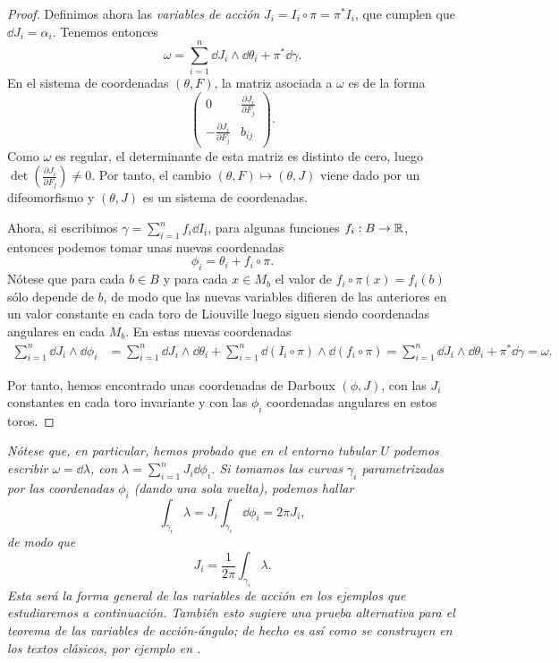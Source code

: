 \begin{proof}
Definimos ahora las \emph{variables de acción} $J_i=I_i\circ \pi = \pi^* I_i$, que cumplen que $\dd J_i = \alpha_i$. Tenemos entonces
\begin{equation*}
  \omega = \sum_{i=1}^n \dd J_i \wedge \dd \theta_i + \pi^* \dd \gamma.
\end{equation*}
En el sistema de coordenadas $(\theta,F)$, la matriz asociada a $\omega$ es de la forma
\begin{equation*}
  \left(
\begin{array}{cc}
  0 &\frac{\partial J_i}{\partial F_j}   \\[5 pt]
  - \frac{\partial J_i}{\partial F_j} & b_{ij}   
 \end{array}
\right).
\end{equation*}
Como $\omega$ es regular, el determinante de esta matriz es distinto de cero, luego $\det \left(\frac{\partial J_i}{\partial F_j}\right)\neq 0$. Por tanto, el cambio $(\theta,F) \mapsto (\theta,J)$ viene dado por un difeomorfismo y $(\theta,J)$ es un sistema de coordenadas.

Ahora, si escribimos $\gamma= \sum_{i=1}^n f_i \dd I_i$, para algunas funciones $f_i:B \rightarrow \mathbb{R}$, entonces podemos tomar unas nuevas coordenadas 
\[
  \phi_i= \theta_i + f_i \circ \pi.
\]
Nótese que para cada $b\in B$ y para cada $x\in M_b$ el valor de $f_i\circ \pi (x)=f_i(b)$ sólo depende de $b$, de modo que las nuevas variables difieren de las anteriores en un valor constante en cada toro de Liouville luego siguen siendo coordenadas angulares en cada $M_b$.
En estas nuevas coordenadas
\[
\begin{split}
  \sum_{i=1}^n \dd J_i \wedge \dd \phi_i & = \sum_{i=1}^n \dd J_i \wedge \dd \theta_i + \sum_{i=1}^n \dd (I_i\circ \pi) \wedge \dd(f_i \circ \pi)   =\sum_{i=1}^n \dd J_i \wedge \dd \theta_i + \pi^* \dd \gamma = \omega.
\end{split}
\]

Por tanto, hemos encontrado unas coordenadas de Darboux $(\phi,J)$, con las $J_i$ constantes en cada toro invariante y con las $\phi_i$ coordenadas angulares en estos toros. 
\end{proof}

\begin{obs}
  \em
  Nótese que, en particular, hemos probado que en el entorno tubular $U$ podemos escribir $\omega= \dd \lambda$, con $\lambda= \sum_{i=1}^n J_i \dd \phi_i$. Si tomamos las curvas $\gamma_i$ parametrizadas por las coordenadas $\phi_i$ (dando una sola vuelta), podemos hallar
  \begin{equation*}
    \int_{\gamma_i} \lambda = J_i \int_{\gamma_i} \dd \phi_i = 2\pi J_i,
  \end{equation*}
  de modo que
  \begin{equation*}
    J_i = \frac{1}{2\pi}\int_{\gamma_i} \lambda.
  \end{equation*}
  Esta será la forma general de las variables de acción en los ejemplos que estudiaremos a continuación. También esto sugiere una prueba alternativa para el teorema de las variables de acción-ángulo; de hecho es así como se construyen en los textos clásicos, por ejemplo en \cite{arnold}.
\end{obs}


